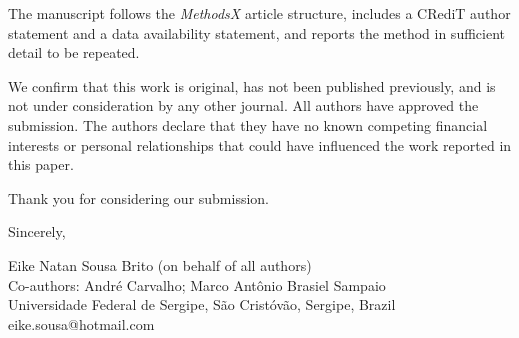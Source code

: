 \documentclass[11pt]{article}
\begin{document}
The manuscript follows the \textit{MethodsX} article structure, includes a
CRediT author statement and a data availability statement, and reports the
method in sufficient detail to be repeated.

We confirm that this work is original, has not been published previously, and is
not under consideration by any other journal. All authors have approved the
submission. The authors declare that they have no known competing financial
interests or personal relationships that could have influenced the work reported
in this paper.

Thank you for considering our submission.

\bigskip
\noindent Sincerely,

\bigskip
\noindent Eike Natan Sousa Brito (on behalf of all authors) \\
Co-authors: Andr\'e Carvalho; Marco Ant\^onio Brasiel Sampaio \\
Universidade Federal de Sergipe, S\~ao Crist\'ov\~ao, Sergipe, Brazil \\
eike.sousa@hotmail.com
\end{document}

